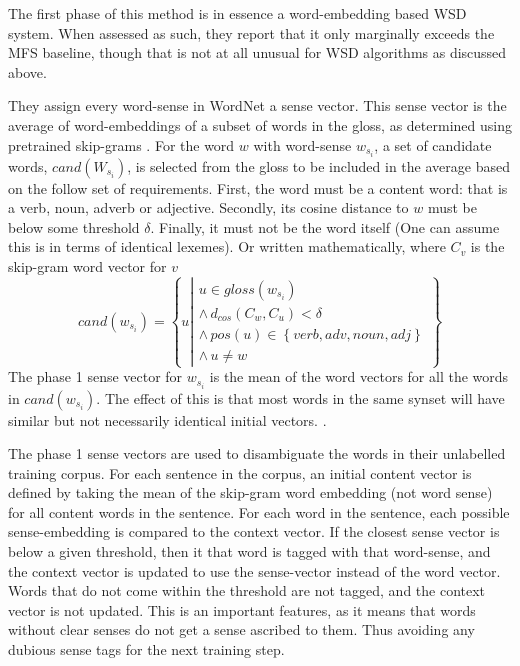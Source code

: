 \documentclass[12pt,parskip]{komatufte}
\begin{document}
The first phase of this method is in essence a word-embedding based WSD system.
When assessed as such, they report that it only marginally exceeds the MFS baseline,
though that is not at all unusual for WSD algorithms as discussed above.

They assign every word-sense in WordNet a sense vector.
This sense vector is the average of word-embeddings of a subset of words in the gloss,
as determined using pretrained skip-grams \parencite{mikolov2013efficient}.
For the word $w$ with word-sense $w_{s_i}$,
a set of candidate words, $cand(W_{s_i})$, is selected from the gloss to be included in the average
based on the follow set of requirements.
First, the word must be a content word: that is a verb, noun, adverb or adjective.
Secondly, its cosine distance to $w$ must be below some threshold $\delta$.
Finally, it must not be the word itself (One can assume this is in terms of identical lexemes).
Or written mathematically, where $C_v$ is the skip-gram word vector for $v$
\begin{equation}
cand(w_{s_{i}})=\left\{ u\left|\begin{array}{c}
u\in gloss(w_{s_{i}})\\
\wedge\, d_{cos}(C_w,C_u)<\delta\\
\wedge\, pos(u)\in\left\{ verb,adv,noun,adj\right\} \\
\wedge\, u\ne w
\end{array}\right.\right\} 
\end{equation}
The phase 1 sense vector for $w_{s_i}$ is the mean of the word vectors for all the words in $cand(w_{s_{i}})$.
The effect of this is that most words in the same synset will have similar but not necessarily identical initial vectors.
.

The phase 1 sense vectors are used to disambiguate the words in their unlabelled training corpus.
For each sentence in the corpus, an initial content vector is defined by taking the mean of the skip-gram word embedding (not word sense) for all content words in the sentence.
For each word in the sentence, each possible sense-embedding is compared to the context vector.
If the closest sense vector is below a given threshold,
then it that word is tagged with that word-sense, and the context vector is updated to use the sense-vector instead of the word vector.
Words that do not come within the threshold are not tagged, and the context vector is not updated.
This is an important features, as it means that words without clear senses do not get a sense ascribed to them.
Thus avoiding any dubious sense tags for the next training step.
\end{document}
